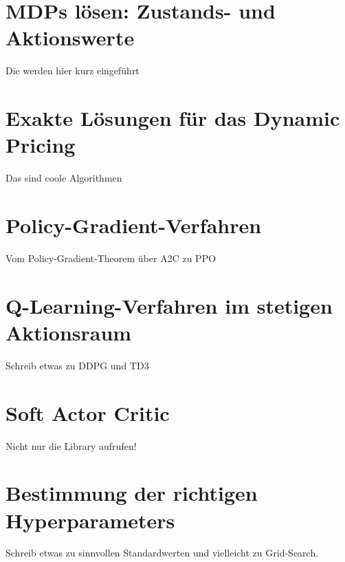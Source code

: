 \section{MDPs lösen: Zustands- und Aktionswerte}
Die werden hier kurz eingeführt

\section{Exakte Lösungen für das Dynamic Pricing}
Das sind coole Algorithmen

\section{Policy-Gradient-Verfahren}
Vom Policy-Gradient-Theorem über A2C zu PPO

\section{Q-Learning-Verfahren im stetigen Aktionsraum}
Schreib etwas zu DDPG und TD3

\section{Soft Actor Critic}
Nicht nur die Library aufrufen!

\section{Bestimmung der richtigen Hyperparameters}
Schreib etwas zu sinnvollen Standardwerten und vielleicht zu Grid-Search.
